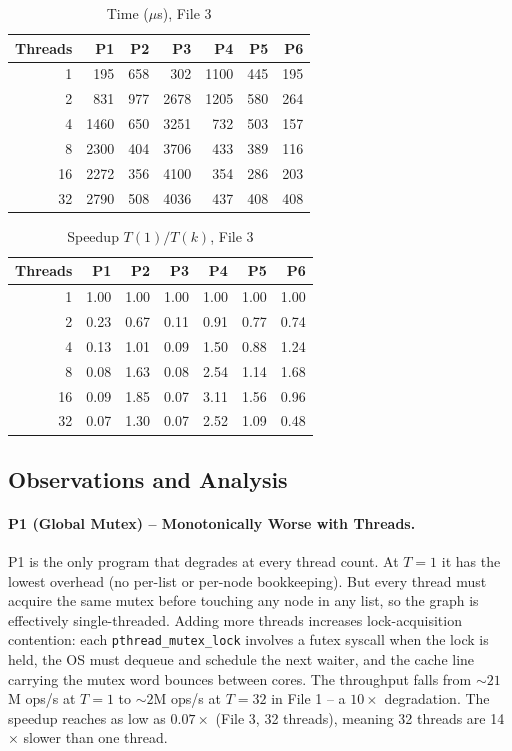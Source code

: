 \documentclass{article}
\begin{document}
\begin{table}[H]
\centering
\caption{Time ($\mu$s), File 3}
\begin{tabular}{r rrrrrr}
\toprule
Threads & P1 & P2 & P3 & P4 & P5 & P6 \\
\midrule
1  &  195 &  658 &  302 & 1100 & 445 & 195 \\
2  &  831 &  977 & 2678 & 1205 & 580 & 264 \\
4  & 1460 &  650 & 3251 &  732 & 503 & 157 \\
8  & 2300 &  404 & 3706 &  433 & 389 & 116 \\
16 & 2272 &  356 & 4100 &  354 & 286 & 203 \\
32 & 2790 &  508 & 4036 &  437 & 408 & 408 \\
\bottomrule
\end{tabular}
\end{table}

\begin{table}[H]
\centering
\caption{Speedup $T(1)/T(k)$, File 3}
\begin{tabular}{r rrrrrr}
\toprule
Threads & P1 & P2 & P3 & P4 & P5 & P6 \\
\midrule
1  & 1.00 & 1.00 & 1.00 & 1.00 & 1.00 & 1.00 \\
2  & 0.23 & 0.67 & 0.11 & 0.91 & 0.77 & 0.74 \\
4  & 0.13 & 1.01 & 0.09 & 1.50 & 0.88 & 1.24 \\
8  & 0.08 & 1.63 & 0.08 & 2.54 & 1.14 & 1.68 \\
16 & 0.09 & 1.85 & 0.07 & 3.11 & 1.56 & 0.96 \\
32 & 0.07 & 1.30 & 0.07 & 2.52 & 1.09 & 0.48 \\
\bottomrule
\end{tabular}
\end{table}

\subsection{Observations and Analysis}

\paragraph{P1 (Global Mutex) -- Monotonically Worse with Threads.}

P1 is the only program that degrades at every thread count.
At $T=1$ it has the lowest overhead (no per-list or per-node bookkeeping).
But every thread must acquire the same mutex before touching any node
in any list, so the graph is effectively single-threaded. Adding more
threads increases lock-acquisition contention: each \texttt{pthread\_mutex\_lock}
involves a futex syscall when the lock is held, the OS must dequeue and
schedule the next waiter, and the cache line carrying the mutex word
bounces between cores. The throughput falls from $\sim21$M ops/s at
$T=1$ to $\sim2$M ops/s at $T=32$ in File 1 -- a $10\times$ degradation.
The speedup reaches as low as $0.07\times$ (File 3, 32 threads), meaning
32 threads are 14$\times$ slower than one thread.
\end{document}
